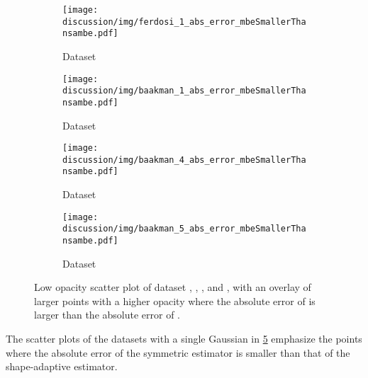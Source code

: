 
\begin{figure}
	\centering
	\begin{subfigure}{0.23\textwidth}
		\centering
		\texttt{[image: discussion/img/ferdosi\_1\_abs\_error\_mbeSmallerThansambe.pdf]}
		\caption{Dataset \ferdosiOne}
		\label{fig:discussion:singleSphere:mbeLowerError:ferdosi1}
	\end{subfigure}
	\begin{subfigure}{0.23\textwidth}
		\centering
		\texttt{[image: discussion/img/baakman\_1\_abs\_error\_mbeSmallerThansambe.pdf]}
		\caption{Dataset \baakmanOne}
		\label{fig:discussion:singleSphere:mbeLowerError:baakman1}
	\end{subfigure}	
	\begin{subfigure}{0.23\textwidth}
		\centering
		\texttt{[image: discussion/img/baakman\_4\_abs\_error\_mbeSmallerThansambe.pdf]}
		\caption{Dataset \baakmanFour}
		\label{fig:discussion:singleSphere:mbeLowerError:baakman4}
	\end{subfigure}		
	\begin{subfigure}{0.23\textwidth}
		\centering
		\texttt{[image: discussion/img/baakman\_5\_abs\_error\_mbeSmallerThansambe.pdf]}
		\caption{Dataset \baakmanFive}
		\label{fig:discussion:singleSphere:mbeLowerError:baakman5}
	\end{subfigure}			
	\caption{Low opacity scatter plot of dataset %
		 \ferdosiOne, %
		 \baakmanOne, %
		 \baakmanFour, and%
		 \baakmanFive, %
		with an overlay of larger points with a higher opacity where the absolute error of \sambe is larger than the absolute error of \mbe.}
	\label{fig:discussion:singleSphere:mbeLowerError}
\end{figure}

The scatter plots of the datasets with a single Gaussian in \cref{fig:discussion:singleSphere:mbeLowerError} emphasize the points where the absolute error of the symmetric estimator is smaller than that of the shape-adaptive estimator. 

